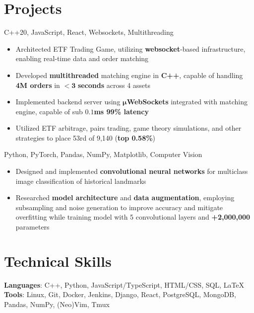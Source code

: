 \documentclass[letterpaper,11pt]{article}
\begin{document}
\section{Projects}
{C++20, JavaScript, React, Websockets, Multithreading}{}
\begin{itemize}
  \item Architected ETF Trading Game, utilizing \textbf{websocket}-based
        infrastructure, enabling real-time data and order matching
  \item Developed \textbf{multithreaded} matching engine in \textbf{C++}, capable of
        handling \textbf{4M orders} in $\mathbf{< 3}$ \textbf{seconds} across 4 assets
  \item Implemented backend server using $\mathbf{\mu}$\textbf{WebSockets}
        integrated with matching engine, capable of sub $\mathbf{0.1}$\textbf{ms 99\% latency}
\end{itemize}
\begin{itemize}
  \item Utilized ETF arbitrage, pairs trading, game theory simulations, and
        other strategies to place 53rd of 9,140 (\textbf{top 0.58\%})
\end{itemize}
{Python, PyTorch, Pandas, NumPy, Matplotlib, Computer Vision}{}
\begin{itemize}
  \item Designed and implemented \textbf{convolutional neural networks} for multiclass
        image classification of historical landmarks
  \item Researched \textbf{model architecture} and \textbf{data augmentation},
        employing subsampling and noise generation to improve accuracy and mitigate
        overfitting while training model with 5 convolutional layers and
        \textbf{+2,000,000} parameters
\end{itemize}
\section{Technical Skills}
\textbf{Languages}: C++, Python, JavaScript/TypeScript, HTML/CSS, SQL, \LaTeX
\\
\textbf{Tools}: Linux, Git, Docker, Jenkins, Django, React, PostgreSQL,
MongoDB, Pandas, NumPy, (Neo)Vim, Tmux
\end{document}
